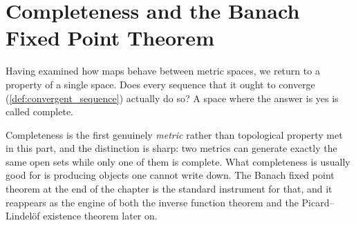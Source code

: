 %
\chapter{Completeness and the Banach Fixed Point Theorem}
\label{ch:completeness}

Having examined how maps behave between metric spaces, we return to a property of a single space.
Does every sequence that  it ought to converge (\cref{def:convergent_sequence})
actually do so? A space where the answer is yes is called complete.

Completeness is the first genuinely \emph{metric} rather than topological property met in this
part, and the distinction is sharp: two metrics can generate exactly the same open sets while
only one of them is complete. What completeness is usually good for is producing objects one
cannot write down. The Banach fixed point theorem at the end of the chapter is the standard
instrument for that, and it reappears as the engine of both the inverse function theorem and the
Picard--Lindelöf existence theorem later on.





